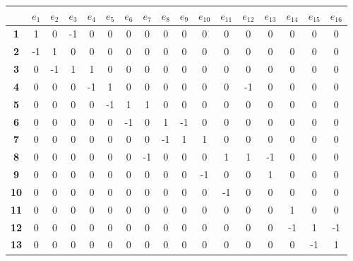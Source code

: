 \documentclass[a4paper,12pt]{article}
\begin{document}
\begin{center}
\tiny
\begin{tabular*}{\textwidth}{c|@{\extracolsep{\fill}}cccccccccccccccc}
\rowcolor[gray]{0.9}
 & \textbf{$e_1$} & \textbf{$e_2$} & \textbf{$e_3$} & \textbf{$e_4$} & \textbf{$e_5$} & \textbf{$e_6$} & \textbf{$e_7$} & \textbf{$e_8$} & \textbf{$e_9$} & \textbf{$e_{10}$} & \textbf{$e_{11}$} & \textbf{$e_{12}$} & \textbf{$e_{13}$} & \textbf{$e_{14}$} & \textbf{$e_{15}$} & \textbf{$e_{16}$} \\
\hline
\textbf{1}  &  1 &  0 & -1 &  0 &  0 &  0 &  0 &  0 &  0 &  0 &  0 &  0 &  0 &  0 &  0 &  0 \\
\textbf{2}  & -1 &  1 &  0 &  0 &  0 &  0 &  0 &  0 &  0 &  0 &  0 &  0 &  0 &  0 &  0 &  0 \\
\textbf{3}  &  0 & -1 &  1 &  1 &  0 &  0 &  0 &  0 &  0 &  0 &  0 &  0 &  0 &  0 &  0 &  0 \\
\textbf{4}  &  0 &  0 &  0 & -1 &  1 &  0 &  0 &  0 &  0 &  0 &  0 & -1 &  0 &  0 &  0 &  0 \\
\textbf{5}  &  0 &  0 &  0 &  0 & -1 &  1 &  1 &  0 &  0 &  0 &  0 &  0 &  0 &  0 &  0 &  0 \\
\textbf{6}  &  0 &  0 &  0 &  0 &  0 & -1 &  0 &  1 & -1 &  0 &  0 &  0 &  0 &  0 &  0 &  0 \\
\textbf{7}  &  0 &  0 &  0 &  0 &  0 &  0 &  0 & -1 &  1 &  1 &  0 &  0 &  0 &  0 &  0 &  0 \\
\textbf{8}  &  0 &  0 &  0 &  0 &  0 &  0 & -1 &  0 &  0 &  0 &  1 &  1 & -1 &  0 &  0 &  0 \\
\textbf{9}  &  0 &  0 &  0 &  0 &  0 &  0 &  0 &  0 &  0 & -1 &  0 &  0 &  1 &  0 &  0 &  0 \\
\textbf{10} &  0 &  0 &  0 &  0 &  0 &  0 &  0 &  0 &  0 &  0 & -1 &  0 &  0 &  0 &  0 &  0 \\
\textbf{11} &  0 &  0 &  0 &  0 &  0 &  0 &  0 &  0 &  0 &  0 &  0 &  0 &  0 &  1 &  0 &  0 \\
\textbf{12} &  0 &  0 &  0 &  0 &  0 &  0 &  0 &  0 &  0 &  0 &  0 &  0 &  0 & -1 &  1 & -1 \\
\textbf{13} &  0 &  0 &  0 &  0 &  0 &  0 &  0 &  0 &  0 &  0 &  0 &  0 &  0 &  0 & -1 &  1 \\
\end{tabular*}
\end{center}

\end{document}
